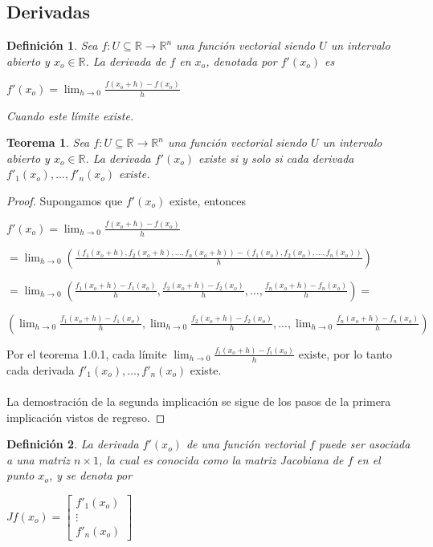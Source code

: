 \documentclass{book}
\newtheorem{theorem}{Teorema}[section]
\newtheorem{definition}{Definición}[section]
\begin{document}
\subsection{Derivadas}
\begin{definition}
Sea $f:U \subseteq \mathbb{R} \rightarrow \mathbb{R}^n$ una función vectorial siendo $U$ un intervalo abierto y $x_o\in \mathbb{R}$. La derivada de $f$ en $x_o$, denotada por $f'(x_o)$ es \begin{center}
       $\displaystyle f'(x_o)=\lim_{h \to 0}\frac{f(x_o+h)-f(x_o)}{h}$
\end{center}
Cuando este límite existe.
\end{definition}
\begin{theorem}
Sea $f:U \subseteq \mathbb{R} \rightarrow \mathbb{R}^n$ una función vectorial siendo $U$ un intervalo abierto y $x_o\in \mathbb{R}$. La derivada $f'(x_o)$ existe si y solo si cada derivada $f'_1(x_o),...,f'_n(x_o)$ existe.
\end{theorem}
\begin{proof}
 Supongamos que $f'(x_o)$ existe, entonces 
\begin{center}
       $\displaystyle f'(x_o)=\lim_{h \to 0}\frac{f(x_o+h)-f(x_o)}{h}$
\end{center}
\begin{center}
       $=\displaystyle \lim_{h \to 0}\left(\frac{(f_1(x_o+h),f_2(x_o+h),...,f_n(x_o+h))-(f_1(x_o),f_2(x_o),...,f_n(x_o))}{h}\right)$
\end{center}
\begin{center}
       $=\displaystyle \lim_{h \to 0}\left(\frac{f_1(x_o+h)-f_1(x_o)}{h},\frac{f_2(x_o+h)-f_2(x_o)}{h},...,\frac{f_n(x_o+h)-f_n(x_o)}{h}\right)=$
\end{center}
\begin{center}
       $\displaystyle  \left(\lim_{h \to 0} \frac{f_1(x_o+h)-f_1(x_o)}{h},\lim_{h \to 0} \frac{f_2(x_o+h)-f_2(x_o)}{h},...,\lim_{h \to 0} \frac{f_n(x_o+h)-f_n(x_o)}{h}\right)$
\end{center}
Por el teorema 1.0.1, cada límite $\displaystyle \lim_{h \to 0} \frac{f_i(x_o+h)-f_i(x_o)}{h}$ existe, por lo tanto cada derivada $f'_1(x_o),...,f'_n(x_o)$ existe.\\\\
La demostración de la segunda implicación se sigue de los pasos de la primera implicación vistos de regreso. 
\end{proof}
\begin{definition}
La derivada $f'(x_o)$ de una función vectorial $f$ puede ser asociada a una matriz $n\times 1$, la cual es
conocida como la matriz Jacobiana de $f$ en el punto $x_o$, y se denota por

\begin{center}
$Jf(x_o)=\begin{bmatrix}
  f'_1(x_o) \\
  \vdots \\
  f'_n(x_o)
\end{bmatrix}$
\end{center}
\end{definition}
\end{document}
